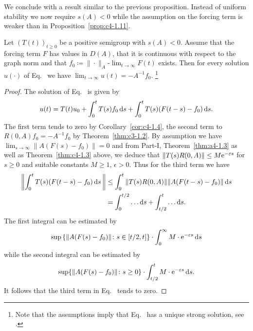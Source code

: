 We conclude with a result similar to the previous proposition.
Instead of uniform stability we now require $s(A) < 0$ while the assumption on the forcing term is weaker than in Proposition~\ref{prop:c4-1.11}.
\begin{proposition}\label{prop:c4-1.12}
Let $(T(t))_{t \geq 0}$ be a positive semigroup with $s(A) < 0$.
Assume that the forcing term $F$ has values in $D(A)$, that it is continuous with respect to the graph norm and that $f_{0} \coloneq  \|\cdot\|_{A}$-$\lim_{t \to \infty} F(t)$ exists.
Then for every solution $u(\cdot)$ of Eq.~ we have $\lim_{t \to \infty} u(t) = -A^{-1}f_{0}$.
\footnote{Note that the assumptions imply that Eq.~ has a unique strong solution, see \textcite[ Theorem~4.2.4]{pazy:1983}.}
\end{proposition}
\begin{proof}
The solution of Eq.~ is given by
\begin{equation}\label{eq:c4-1.8}
u(t) = T(t)u_{0} + \int_{0}^{t} T(s)f_{0} \mathop{}\!\mathrm{d}{s} + \int_{0}^{t} T(s)(F(t-s)-f_{0}) \mathop{}\!\mathrm{d}{s} .
\end{equation}
The first term tends to zero by Corollary~\ref{cor:c4-1.4},  
the second term to $R(0,A)f_{0} = -A^{-1}f_{0}$ by Theorem~\ref{thm:c3-1.2}.
By assumption we have $\lim_{s \to \infty}\|A(F(s)-f_{0})\| = 0$ and from Part-I,
Theorem~\ref{thm:a4-1.3} as well as Theorem~\ref{thm:c4-1.3} above, we deduce that $\|T(s)R(0,A)\| \leq M\eu^{-\epsilon s}$ for $s \geq 0$ and suitable constants $M \geq 1$, $\epsilon > 0$.
Thus for the third term we have
\begin{align*}
 \left\|\int_{0}^{t} T(s)(F(t-s)-f_{0}) \ds\,\right\| &\leq \int_{0}^{t} \|T(s)R(0,A)\| \|A(F(t-s)-f_{0})\| \ds \\
&= \int_{0}^{t/2} \ldots \ds + \int_{t/2}^{t} \ldots \ds.
\end{align*}
The first integral can be estimated by
\[
 \sup  \left\{\|A(F(s)-f_{0})\| \colon s \in 
 \left[ t/2 , t \right] \right\} 
\cdot \int_{0}^{\infty} M \cdot \eu^{-\epsilon s} \ds
\]
while the second integral can be estimated by 
\[
\sup\{\|A(F(s)-f_{0})\| \colon s \geq 0\}
\cdot \int_{t/2}^{t} M \cdot \eu^{- \epsilon s} \ds.
\]
It follows that the third term in Eq.~ tends to zero.
\end{proof}
\clearpage
